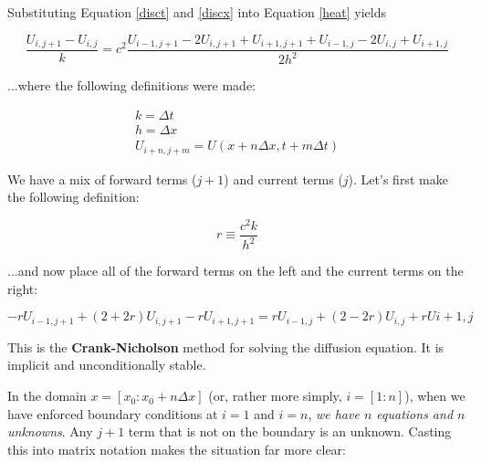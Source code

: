 \documentclass[12pt, letterpaper]{article}
\begin{document}
\noindent
Substituting Equation \ref{disct} and \ref{discx} into Equation \ref{heat}
yields

\begin{equation}
  \label{heat_disc}
  \frac{U_{i,j+1}-U_{i,j}}{k} = c^{2}\frac{U_{i-1,j+1}-2U_{i,j+1}+U_{i+1,j+1}+
    U_{i-1,j}-2U_{i,j}+U_{i+1,j}}{2h^{2}}
\end{equation}

\noindent
...where the following definitions were made:

\begin{equation}
  \label{subs}
  \begin{array}{c}
  k=\Delta t \\
  h=\Delta x \\
  U_{i+n, j+m} = U(x+n\Delta x, t+m\Delta t)
  \end{array}
\end{equation}

We have a mix of forward terms ($j+1$) and current terms ($j$).  Let's first
make the following definition:

\begin{equation}
  \label{r}
  r \equiv \frac{c^{2}k}{h^{2}}
\end{equation}

\noindent
...and now place all of the forward terms on the left and the current terms
on the right:

\begin{equation}
  \label{cn}
  -rU_{i-1,j+1} + (2+2r)U_{i,j+1} - rU_{i+1,j+1} = 
  rU_{i-1,j} + (2-2r)U_{i,j} +rU{i+1,j}
\end{equation}

\noindent
This is the \textbf{Crank-Nicholson} method for solving the diffusion equation.
It is implicit and unconditionally stable.

In the domain $x=[x_{0}:x_{0}+n\Delta x]$ (or, rather more simply, $i=[1:n]$),
when we have enforced boundary conditions at $i=1$ and $i=n$, \emph{we have
$n$ equations and $n$ unknowns}.  Any $j+1$ term that is not on the boundary
is an unknown.  Casting this into matrix notation makes the situation far
more clear:
\end{document}
